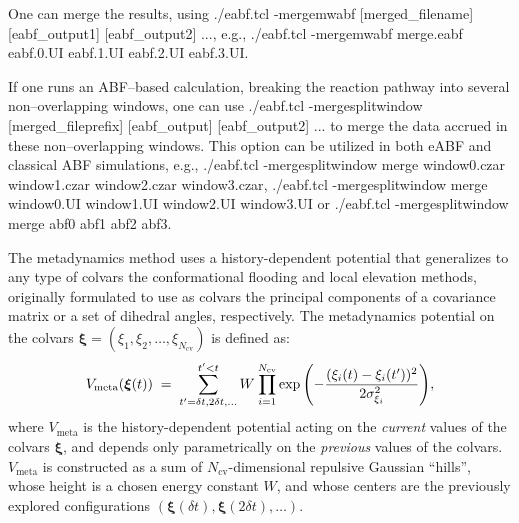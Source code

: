 {One can merge the results, using
{\ttfamily ./eabf.tcl -mergemwabf [merged\_filename] [eabf\_output1] [eabf\_output2] ...},
e.g.,
{\ttfamily ./eabf.tcl -mergemwabf merge.eabf eabf.0.UI eabf.1.UI eabf.2.UI eabf.3.UI}.

If one runs an ABF--based calculation, breaking the reaction pathway
into several non--overlapping windows, one can use
{\ttfamily ./eabf.tcl -mergesplitwindow [merged\_fileprefix] [eabf\_output] [eabf\_output2] ...}
to merge the data accrued in these non--overlapping windows.
This option can be utilized in both eABF and classical ABF simulations, e.g.,
{\ttfamily ./eabf.tcl -mergesplitwindow merge window0.czar window1.czar window2.czar window3.czar},
{\ttfamily ./eabf.tcl -mergesplitwindow merge window0.UI window1.UI window2.UI window3.UI} or
{\ttfamily ./eabf.tcl -mergesplitwindow merge abf0 abf1 abf2 abf3}.
}



The metadynamics method uses a history-dependent potential \cite{Laio2002} that generalizes to any type of colvars the conformational flooding \cite{Grubmuller1995} and local elevation \cite{Huber1994} methods,  originally formulated to use as colvars the principal components of a covariance matrix or a set of dihedral  angles, respectively.
The metadynamics potential on the colvars $\bm{\xi} = (\xi_{1}, \xi_{2}, \ldots, \xi_{N_{\mathrm{cv}}})$ is defined as:
\begin{equation}
  \label{eq:colvars_meta_pot}
  V_{\mathrm{meta}}({\mbox{\boldmath{$\xi$}}}(t)) \; = \; {
    \sum_{t' = \delta{}t, \\ 2\delta{}t, \\ \ldots}^{t'<t} W \: {
      \prod_{i = 1}^{N_{\mathrm{cv}}}
      \exp\left(-\frac{(\xi_{i}(t)-\xi_{i}(t'))^{2}}{2\sigma_{\xi_{i}}^{2}}\right)
    }
  }\mathrm{,}
\end{equation}
where $V_{\mathrm{meta}}$ is the history-dependent potential acting on the \emph{current} values of the colvars $\bm{\xi}$, and depends only parametrically on the \emph{previous} values of the colvars.
$V_{\mathrm{meta}}$ is constructed as a sum of $N_{\mathrm{cv}}$-dimensional repulsive Gaussian ``hills'', whose height is a chosen energy constant $W$, and whose centers are the previously explored configurations $\left(\bm{\xi}(\delta{}t), \bm{\xi}(2\delta{}t), \ldots\right)$.

